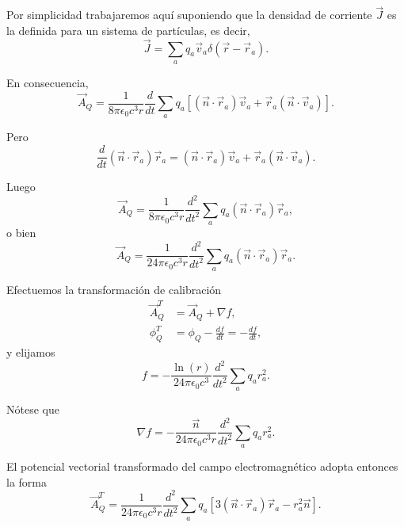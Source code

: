 \documentclass[12pt,a4paper]{book}
\begin{document}
Por simplicidad trabajaremos aquí suponiendo que la densidad de corriente $\vec{J}$ es la definida para un sistema de partículas, es decir,
\begin{equation}
\vec{J} = \sum_a q_a \vec{v}_a \delta(\vec{r} - \vec{r}_a).
\end{equation}

En consecuencia,
\begin{equation}
\vec{A}_Q = \frac{1}{8\pi\epsilon_0 c^3 r}\frac{d}{dt}\sum_a q_a [(\vec{n} \cdot \vec{r}_a)\vec{v}_a + \vec{r}_a(\vec{n} \cdot \vec{v}_a)].
\end{equation}

Pero
\begin{equation}
\frac{d}{dt}(\vec{n} \cdot \vec{r}_a)\vec{r}_a = (\vec{n} \cdot \vec{r}_a)\vec{v}_a + \vec{r}_a(\vec{n} \cdot \vec{v}_a).
\end{equation}

Luego
\begin{equation}
\vec{A}_Q = \frac{1}{8\pi\epsilon_0 c^3 r}\frac{d^2}{dt^2}\sum_a q_a (\vec{n} \cdot \vec{r}_a)\vec{r}_a,
\end{equation}
o bien
\begin{equation}
\vec{A}_Q = \frac{1}{24\pi\epsilon_0 c^3 r}\frac{d^2}{dt^2}\sum_a q_a (\vec{n} \cdot \vec{r}_a)\vec{r}_a.
\end{equation}

Efectuemos la transformación de calibración
\begin{align}
\vec{A}_Q^T &= \vec{A}_Q + \nabla f,\\
\phi_Q^T &= \phi_Q - \frac{df}{dt} = -\frac{df}{dt},
\end{align}
y elijamos
\begin{equation}
f = -\frac{\ln(r)}{24\pi\epsilon_0 c^3}\frac{d^2}{dt^2}\sum_a q_a r_a^2.
\end{equation}

Nótese que
\begin{equation}
\nabla f = -\frac{\vec{n}}{24\pi\epsilon_0c^3 r}\frac{d^2}{dt^2}\sum_a q_a r_a^2.
\end{equation}

El potencial vectorial transformado del campo electromagnético adopta entonces la forma
\begin{equation}
\vec{A}_Q^T = \frac{1}{24\pi\epsilon_0 c^3 r}\frac{d^2}{dt^2}\sum_a q_a [3(\vec{n} \cdot \vec{r}_a)\vec{r}_a - r_a^2\vec{n}].
\end{equation}
\end{document}
